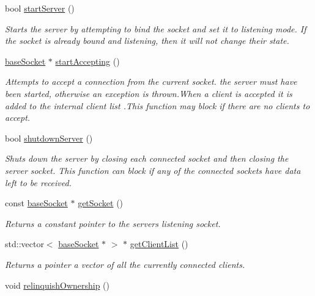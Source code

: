 \begin{DoxyCompactItemize}
bool \hyperlink{class_communication_1_1_server_a30f8961c165145504a3c29410c0b643c}{start\+Server} ()
\begin{DoxyCompactList}\small\item\em Starts the server by attempting to bind the socket and set it to listening mode. If the socket is already bound and listening, then it will not change their state. \end{DoxyCompactList}\item 
\hyperlink{class_communication_1_1base_socket}{base\+Socket} $\ast$ \hyperlink{class_communication_1_1_server_aa005d6dfbb2f3d09bb6f5c31c7f61563}{start\+Accepting} ()
\begin{DoxyCompactList}\small\item\em Attempts to accept a connection from the current socket. the server must have been started, otherwise an exception is thrown.\+When a client is accepted it is added to the internal client list .This function may block if there are no clients to accept. \end{DoxyCompactList}\item 
bool \hyperlink{class_communication_1_1_server_a9d80054a0eb0a8f4935a766344f9e076}{shutdown\+Server} ()
\begin{DoxyCompactList}\small\item\em Shuts down the server by closing each connected socket and then closing the server socket. This function can block if any of the connected sockets have data left to be received. \end{DoxyCompactList}\item 
const \hyperlink{class_communication_1_1base_socket}{base\+Socket} $\ast$ \hyperlink{class_communication_1_1_server_a0a8014847e1d2e241ee30d48e0b307d7}{get\+Socket} ()
\begin{DoxyCompactList}\small\item\em Returns a constant pointer to the servers listening socket. \end{DoxyCompactList}\item 
std\+::vector$<$ \hyperlink{class_communication_1_1base_socket}{base\+Socket} $\ast$ $>$ $\ast$ \hyperlink{class_communication_1_1_server_afb6658eb5983662bfc36f13f562f3acf}{get\+Client\+List} ()
\begin{DoxyCompactList}\small\item\em Returns a pointer a vector of all the currently connected clients. \end{DoxyCompactList}\item 
void \hyperlink{class_communication_1_1_server_a3f5fc277d677db87a1b3ec8a064cfe7c}{relinquish\+Ownership} ()

\end{DoxyCompactItemize}
